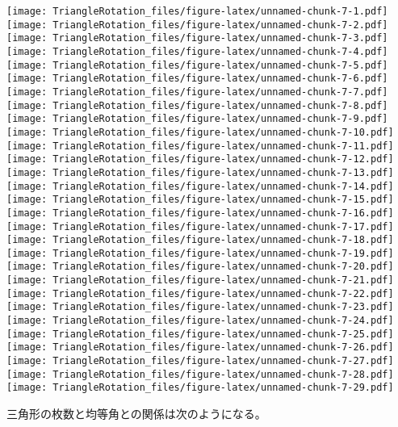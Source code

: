 \documentclass[]{article}
\newenvironment{Shaded}{\begin{snugshade}}{\end{snugshade}}
\newcommand{\KeywordTok}[1]{\textcolor[rgb]{0.13,0.29,0.53}{\textbf{#1}}}
\newcommand{\DataTypeTok}[1]{\textcolor[rgb]{0.13,0.29,0.53}{#1}}
\newcommand{\StringTok}[1]{\textcolor[rgb]{0.31,0.60,0.02}{#1}}
\newcommand{\ControlFlowTok}[1]{\textcolor[rgb]{0.13,0.29,0.53}{\textbf{#1}}}
\newcommand{\OperatorTok}[1]{\textcolor[rgb]{0.81,0.36,0.00}{\textbf{#1}}}
\newcommand{\NormalTok}[1]{#1}
\begin{document}
\texttt{[image: TriangleRotation\_files/figure-latex/unnamed-chunk-7-1.pdf]}
\texttt{[image: TriangleRotation\_files/figure-latex/unnamed-chunk-7-2.pdf]}
\texttt{[image: TriangleRotation\_files/figure-latex/unnamed-chunk-7-3.pdf]}
\texttt{[image: TriangleRotation\_files/figure-latex/unnamed-chunk-7-4.pdf]}
\texttt{[image: TriangleRotation\_files/figure-latex/unnamed-chunk-7-5.pdf]}
\texttt{[image: TriangleRotation\_files/figure-latex/unnamed-chunk-7-6.pdf]}
\texttt{[image: TriangleRotation\_files/figure-latex/unnamed-chunk-7-7.pdf]}
\texttt{[image: TriangleRotation\_files/figure-latex/unnamed-chunk-7-8.pdf]}
\texttt{[image: TriangleRotation\_files/figure-latex/unnamed-chunk-7-9.pdf]}
\texttt{[image: TriangleRotation\_files/figure-latex/unnamed-chunk-7-10.pdf]}
\texttt{[image: TriangleRotation\_files/figure-latex/unnamed-chunk-7-11.pdf]}
\texttt{[image: TriangleRotation\_files/figure-latex/unnamed-chunk-7-12.pdf]}
\texttt{[image: TriangleRotation\_files/figure-latex/unnamed-chunk-7-13.pdf]}
\texttt{[image: TriangleRotation\_files/figure-latex/unnamed-chunk-7-14.pdf]}
\texttt{[image: TriangleRotation\_files/figure-latex/unnamed-chunk-7-15.pdf]}
\texttt{[image: TriangleRotation\_files/figure-latex/unnamed-chunk-7-16.pdf]}
\texttt{[image: TriangleRotation\_files/figure-latex/unnamed-chunk-7-17.pdf]}
\texttt{[image: TriangleRotation\_files/figure-latex/unnamed-chunk-7-18.pdf]}
\texttt{[image: TriangleRotation\_files/figure-latex/unnamed-chunk-7-19.pdf]}
\texttt{[image: TriangleRotation\_files/figure-latex/unnamed-chunk-7-20.pdf]}
\texttt{[image: TriangleRotation\_files/figure-latex/unnamed-chunk-7-21.pdf]}
\texttt{[image: TriangleRotation\_files/figure-latex/unnamed-chunk-7-22.pdf]}
\texttt{[image: TriangleRotation\_files/figure-latex/unnamed-chunk-7-23.pdf]}
\texttt{[image: TriangleRotation\_files/figure-latex/unnamed-chunk-7-24.pdf]}
\texttt{[image: TriangleRotation\_files/figure-latex/unnamed-chunk-7-25.pdf]}
\texttt{[image: TriangleRotation\_files/figure-latex/unnamed-chunk-7-26.pdf]}
\texttt{[image: TriangleRotation\_files/figure-latex/unnamed-chunk-7-27.pdf]}
\texttt{[image: TriangleRotation\_files/figure-latex/unnamed-chunk-7-28.pdf]}
\texttt{[image: TriangleRotation\_files/figure-latex/unnamed-chunk-7-29.pdf]}

三角形の枚数と均等角との関係は次のようになる。

\begin{Shaded}
\end{Shaded}
\end{document}

